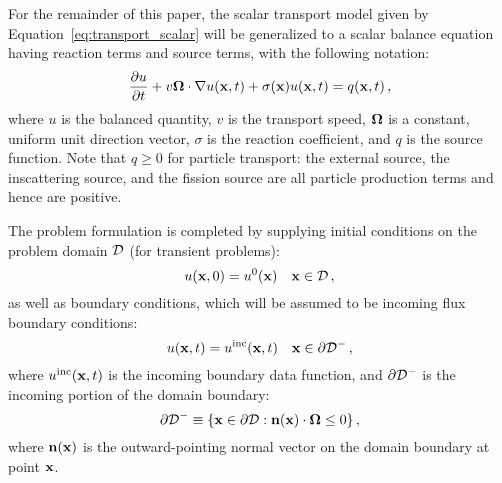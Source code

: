 For the remainder of this paper, the scalar transport model given by
Equation~\eqref{eq:transport_scalar} will be generalized to a scalar
balance equation having reaction terms and source terms, with the following
notation:
\begin{equation}\label{eq:scalar_model}
  \frac{\partial u}{\partial t} + v\mathbf{\Omega}\cdot\nabla u(\mathbf{x},t)
    + \sigma(\mathbf{x}) u(\mathbf{x},t) = q(\mathbf{x},t)
  \,,
\end{equation}
where $u$ is the balanced quantity, $v$ is the transport speed, $\mathbf{\Omega}$ is
a constant, uniform unit direction vector, $\sigma$ is the reaction coefficient,
and $q$ is the source function. Note that $q \ge 0$ for particle transport: the
external source, the inscattering source, and the fission source are all particle
production terms and hence are positive.

The problem formulation is completed by supplying initial conditions on the
problem domain $\mathcal{D}$ (for transient problems):
\begin{equation}
  u(\mathbf{x},0) = u^0(\mathbf{x}) \quad \mathbf{x}\in\mathcal{D} \,,
\end{equation}
as well as boundary conditions,
which will be assumed to be incoming flux boundary conditions:
\begin{equation}
  u(\mathbf{x},t) = u^{\textup{inc}}(\mathbf{x},t) \quad \mathbf{x}\in\partial\mathcal{D}^- \,,
\end{equation}
where $u^{\textup{inc}}(\mathbf{x},t)$ is the incoming boundary data function, and
$\partial\mathcal{D}^-$ is the incoming portion of the domain boundary:
\begin{equation}
  \partial\mathcal{D}^- \equiv \{ \mathbf{x}\in\partial\mathcal{D} :
  \mathbf{n}(\mathbf{x})\cdot\mathbf{\Omega} \leq 0 \} \,,
\end{equation}
where $\mathbf{n}(\mathbf{x})$ is the outward-pointing normal vector on the domain
boundary at point $\mathbf{x}$.

